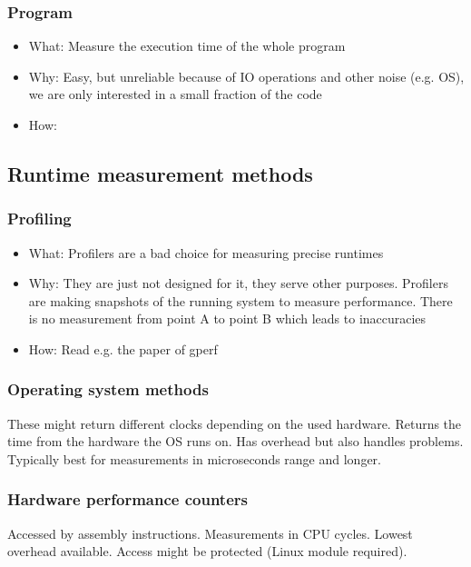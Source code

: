 \subsubsection{Program}
\begin{itemize}
    \item What: Measure the execution time of the whole program
    \item Why: Easy, but unreliable because of IO operations and other noise (e.g. OS), we are only interested in a small fraction of the code
    \item How: 
\end{itemize}

\subsection{Runtime measurement methods}
\subsubsection{Profiling}
\begin{itemize}
    \item What: Profilers are a bad choice for measuring precise runtimes
    \item Why: They are just not designed for it, they serve other purposes.
        Profilers are making snapshots of the running system to measure performance. 
        There is no measurement from point A to point B which leads to inaccuracies
    \item How: Read e.g. the paper of gperf \cite{graham1982gprof}
\end{itemize}
\subsubsection{Operating system methods}
These might return different clocks depending on the used hardware.
Returns the time from the hardware the OS runs on.
Has overhead but also handles problems.
Typically best for measurements in microseconds range and longer.
\subsubsection{Hardware performance counters}
Accessed by assembly instructions.
Measurements in CPU cycles.
Lowest overhead available.
Access might be protected (Linux module required).
